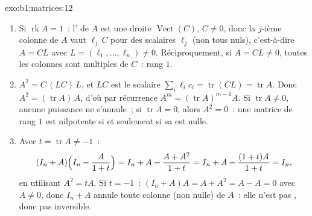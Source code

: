 \begin{solution}{exo:b1:matrices:12}
\begin{enumerate}
  \item Si $\operatorname{rk} A = 1$~: l' de $A$ est une droite
        $\operatorname{Vect}(C)$, $C \neq 0$, donc la $j$-ième
        colonne de $A$ vaut $\ell_j\,C$ pour des scalaires $\ell_j$
        (non tous nuls), c'est-à-dire $A = C L$ avec $L = (\ell_1,
        \dots, \ell_n) \neq 0$. Réciproquement, si $A = CL \neq 0$,
        toutes les colonnes sont multiples de $C$~: rang $1$.
  \item $A^2 = C\,(L C)\,L$, et $LC$ est le scalaire $\sum_i
        \ell_i c_i = \operatorname{tr}(CL) = \operatorname{tr}
        A$. Donc $A^2 = (\operatorname{tr} A)\,A$, d'où par
        récurrence $A^m = (\operatorname{tr} A)^{m-1} A$. Si
        $\operatorname{tr} A \neq 0$, aucune puissance ne s'annule~;
        si $\operatorname{tr} A = 0$, alors $A^2 = 0$~: une matrice
        de rang $1$ est nilpotente si et seulement si sa  est
        nulle.
  \item Avec $t = \operatorname{tr} A \neq -1$~:
        \[
        (I_n + A)\Bigl(I_n - \frac{A}{1 + t}\Bigr)
        = I_n + A - \frac{A + A^2}{1 + t}
        = I_n + A - \frac{(1 + t)A}{1 + t} = I_n ,
        \]
        en utilisant $A^2 = tA$. Si $t = -1$~: $(I_n + A)A = A + A^2 =
        A - A = 0$ avec $A \neq 0$, donc $I_n + A$ annule toute
        colonne (non nulle) de $A$~: elle n'est pas , donc
        pas inversible.
\end{enumerate}
\end{solution}


